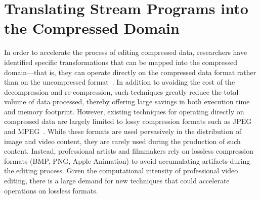 
\chapter{Translating Stream Programs into the Compressed Domain}



In order to accelerate the process of editing compressed data,
researchers have identified specific transformations that can be
mapped into the compressed domain---that is, they can operate directly
on the compressed data format rather than on the uncompressed
format~\cite{chang95survey,mandal95survey,smith95survey,wee02survey}.
In addition to avoiding the cost of the decompression and
re-compression, such techniques greatly reduce the total volume of
data processed, thereby offering large savings in both execution time
and memory footprint.  However, existing techniques for operating
directly on compressed data are largely limited to lossy compression
formats such as
JPEG~\cite{dugad01,feng03,mukherjee02,shen96b,shen96,shen98,smith96b}
and MPEG~\cite{smith98,dorai00,nang00,vasudev98,wee02survey}.  While
these formats are used pervasively in the distribution of image and
video content, they are rarely used during the production of such
content.  Instead, professional artists and filmmakers rely on
lossless compression formats (BMP, PNG, Apple Animation) to avoid
accumulating artifacts during the editing process.  Given the
computational intensity of professional video editing, there is a
large demand for new techniques that could accelerate operations on
lossless formats.

